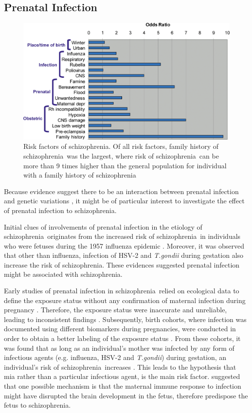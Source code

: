 \documentclass[12pt]{scrbook}
\newcommand*{\scz}{schizophrenia}
\begin{document}
\subsection{Prenatal Infection}
\begin{figure}
	\centering
	\includegraphics[width=\textwidth]{figure/risk_factors_of_schizophrenia.png}
	\caption[Risk factors of \scz]{Risk factors of \scz.
		Of all risk factors, family history of \scz\ was the largest, where risk of \scz\ can be more than 9 times higher than the general population for individual with a family history of \scz}
	\label{fig:riskfactors}
\end{figure}

Because evidence suggest there to be an interaction between prenatal infection and genetic variations \citep{Clarke2009}, it might be of particular interest to investigate the effect of prenatal infection to \scz.

Initial clues of involvements of prenatal infection in the etiology of \scz\ originates from the increased risk of \scz\ in individuals who were fetuses during the 1957 influenza epidemic \citep{Mednick1958}.
Moreover, it was observed that other than influenza, infection of HSV-2 and \textit{T.gondii} during gestation also increase the risk of \scz\citep{Brown2010}.
These evidences suggested prenatal infection might be associated with \scz.

Early studies of prenatal infection in \scz\ relied on ecological data to define the exposure status without any confirmation of maternal infection during pregnancy \citep{Brown2010}.
Therefore, the exposure status were inaccurate and unreliable, leading to inconsistent findings \citep{Brown2010}.  
Subsequently, birth cohorts, where infection was documented using different biomarkers during pregnancies, were conducted in order to obtain a better labeling of the exposure status \citep{Brown2010}.
From these cohorts, it was found that as long as an individual's mother was infected by any form of infectious agents (e.g. influenza, HSV-2 and \textit{T.gondii}) during gestation, an individual's risk of \scz\ increases \citep{Brown2010}.
This leads to the hypothesis that \gls{mia} \citep{Brown2010} rather than a particular infectious agent, is the main risk factor. 
\citet{Garbett2012a} suggested that one possible mechanism is that the maternal immune response to infection might have disrupted the brain development in the fetus, therefore predispose the fetus to \scz.
\end{document}
